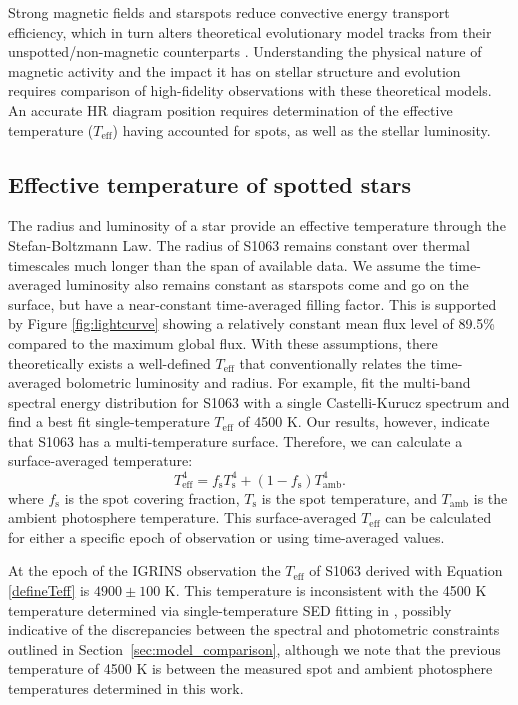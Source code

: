\documentclass[twocolumn,tighten]{aastex631}
\begin{document}
Strong magnetic fields and starspots reduce convective energy transport efficiency, which in turn alters theoretical evolutionary model tracks from their unspotted/non-magnetic counterparts \citep{2013ApJ...779..183F,somers15,somers15b,somers20}. Understanding the physical nature of magnetic activity and the impact it has on stellar structure and evolution requires comparison of high-fidelity observations with these theoretical models.  An accurate HR diagram position requires determination of the effective temperature ($T_{\mathrm{eff}}$) having accounted for spots, as well as the stellar luminosity.

\subsection{Effective temperature of spotted stars}


The radius and luminosity of a star provide an effective temperature through the Stefan-Boltzmann Law. The radius of S1063 remains constant over thermal timescales much longer than the span of available data. We assume the time-averaged luminosity also remains constant as starspots come and go on the surface, but have a near-constant time-averaged filling factor. This is supported by Figure \ref{fig:lightcurve} showing a relatively constant mean flux level of 89.5\% compared to the maximum global flux. With these assumptions, there theoretically exists a well-defined $T_{\mathrm{eff}}$ that conventionally relates the time-averaged bolometric luminosity and radius. For example, \citet{leiner17} fit the multi-band spectral energy distribution for S1063 with a single Castelli-Kurucz spectrum \citep{2003IAUS..210P.A20C} and find a best fit single-temperature $T_{\mathrm{eff}}$ of 4500 K. Our results, however, indicate that S1063 has a multi-temperature surface. Therefore, we can calculate a surface-averaged temperature: 
\begin{equation}
T_{\mathrm{eff}}^4 = f_{\mathrm{s}} T_{\mathrm{s}}^4 + (1 -f_{\mathrm{s}}) T_{\mathrm{amb}}^4 . \label{defineTeff}
\end{equation}
where $f_{\mathrm{s}}$ is the spot covering fraction, $T_{\mathrm{s}}$ is the spot temperature, and $T_{\mathrm{amb}}$ is the ambient photosphere temperature.  This surface-averaged $T_{\mathrm{eff}}$ can be calculated for either a specific epoch of observation or using time-averaged values. 

At the epoch of the IGRINS observation the $T_{\mathrm{eff}}$ of S1063 derived with Equation \ref{defineTeff} is $4900\pm100$ K. This temperature is inconsistent with the 4500 K temperature determined via single-temperature SED fitting in \citet{leiner17}, possibly indicative of the discrepancies between the spectral and photometric constraints outlined in Section~\ref{sec:model_comparison}, although we note that the previous temperature of 4500 K is between the measured spot and ambient photosphere temperatures determined in this work.
\end{document}
